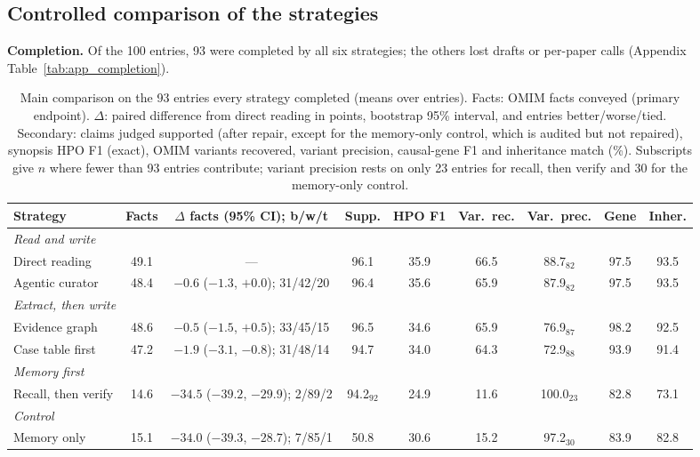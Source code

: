 \documentclass{article} %
\begin{document}
\subsection{Controlled comparison of the strategies}
\label{sec:main}
\textbf{Completion.} Of the 100 entries, 93 were completed by all six strategies; the others lost drafts or per-paper calls (Appendix Table~\ref{tab:app_completion}).

\begin{table}[t]
\caption{Main comparison on the 93 entries every strategy completed (means over entries). Facts: OMIM facts conveyed (primary endpoint). $\Delta$: paired difference from direct reading in points, bootstrap 95\% interval, and entries better/worse/tied. Secondary: claims judged supported (after repair, except for the memory-only control, which is audited but not repaired), synopsis HPO F1 (exact), OMIM variants recovered, variant precision, causal-gene F1 and inheritance match (\%). Subscripts give $n$ where fewer than 93 entries contribute; variant precision rests on only 23 entries for recall, then verify and 30 for the memory-only control.}
\label{tab:main}
\begin{center}
\footnotesize
\setlength{\tabcolsep}{2.2pt}
\begin{tabular}{lcccccccc}
\toprule
Strategy & Facts & $\Delta$ facts (95\% CI); b/w/t & Supp. & HPO F1 & Var.\ rec. & Var.\ prec. & Gene & Inher. \\
\midrule
\multicolumn{9}{l}{\emph{Read and write}} \\
Direct reading & 49.1 & --- & 96.1 & 35.9 & 66.5 & 88.7$_{82}$ & 97.5 & 93.5 \\
Agentic curator & 48.4 & $-0.6$ ($-1.3$, $+0.0$); 31/42/20 & 96.4 & 35.6 & 65.9 & 87.9$_{82}$ & 97.5 & 93.5 \\
\multicolumn{9}{l}{\emph{Extract, then write}} \\
Evidence graph & 48.6 & $-0.5$ ($-1.5$, $+0.5$); 33/45/15 & 96.5 & 34.6 & 65.9 & 76.9$_{87}$ & 98.2 & 92.5 \\
Case table first & 47.2 & $-1.9$ ($-3.1$, $-0.8$); 31/48/14 & 94.7 & 34.0 & 64.3 & 72.9$_{88}$ & 93.9 & 91.4 \\
\multicolumn{9}{l}{\emph{Memory first}} \\
Recall, then verify & 14.6 & $-34.5$ ($-39.2$, $-29.9$); 2/89/2 & 94.2$_{92}$ & 24.9 & 11.6 & 100.0$_{23}$ & 82.8 & 73.1 \\
\multicolumn{9}{l}{\emph{Control}} \\
Memory only & 15.1 & $-34.0$ ($-39.3$, $-28.7$); 7/85/1 & 50.8 & 30.6 & 15.2 & 97.2$_{30}$ & 83.9 & 82.8 \\
\bottomrule
\end{tabular}
\end{center}
\end{table}
\end{document}
